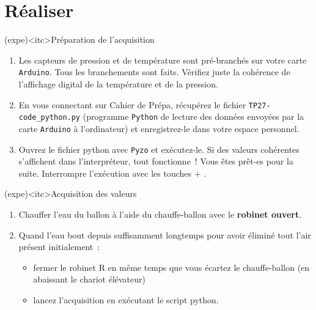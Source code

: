\documentclass[a4paper, 10pt, final, garamond]{book}
\begin{document}
{	\section{Réaliser}
	\begin{tcn}[breakable](expe)<itc>{Préparation de l'acquisition}
		\begin{enumerate}
			\item Les capteurs de pression et de température sont pré-branchés sur votre
			      carte \texttt{Arduino}. Tous les branchements sont faits. Vérifiez
			      juste la cohérence de l'affichage digital de la température et de la
			      pression.

			\item En vous connectant sur Cahier de Prépa, récupérez le fichier
			      \texttt{TP27-code\_python.py} (programme \texttt{Python} de lecture
			      des données envoyées par la carte \texttt{Arduino} à l'ordinateur) et
			      enregistrez-le dans votre espace personnel.

			\item  Ouvrez le fichier python avec \texttt{Pyzo} et exécutez-le. Si des
			      valeurs cohérentes s'affichent dans l'interpréteur, tout fonctionne~!
			      Vous êtes prêt-es pour la suite. Interrompre l'exécution avec les
			      touches  + .
		\end{enumerate}
	\end{tcn}

	\begin{tcn}(expe)<itc>{Acquisition des valeurs}
		\begin{enumerate}[resume]
			\item Chauffer l'eau du ballon à l'aide du chauffe-ballon avec le
			      \textbf{robinet ouvert}.

			\item Quand l'eau bout depuis suffisamment longtemps pour avoir éliminé tout
			      l'air présent initialement~:
			      \begin{itemize}
				      \item fermer le robinet R en même temps que vous écartez le
				            chauffe-ballon (en abaissant le chariot élévateur)

				      \item lancez l'acquisition en exécutant le script python.
			      \end{itemize}


\end{enumerate}
\end{tcn}}
\end{document}
